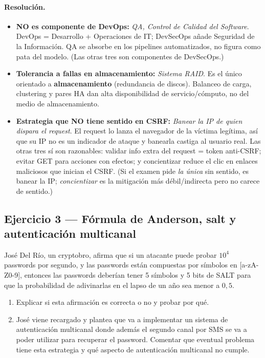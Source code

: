 \paragraph{Resolución.}
\begin{itemize}
  \item \textbf{NO es componente de DevOps:} \emph{QA, Control de Calidad del Software}. DevOps = Desarrollo + Operaciones de IT; DevSecOps añade Seguridad de la Información. QA se absorbe en los pipelines automatizados, no figura como pata del modelo. (Las otras tres son componentes de DevSecOps.)
  \item \textbf{Tolerancia a fallas en almacenamiento:} \emph{Sistema RAID}. Es el único orientado a \textbf{almacenamiento} (redundancia de discos). Balanceo de carga, clustering y pares HA dan alta disponibilidad de servicio/cómputo, no del medio de almacenamiento.
  \item \textbf{Estrategia que NO tiene sentido en CSRF:} \emph{Banear la IP de quien dispara el request}. El request lo lanza el navegador de la víctima legítima, así que su IP no es un indicador de ataque y banearla castiga al usuario real. Las otras tres sí son razonables: validar info extra del request = token anti-CSRF; evitar GET para acciones con efectos; y concientizar reduce el clic en enlaces maliciosos que inician el CSRF. (Si el examen pide \emph{la única} sin sentido, es banear la IP; \emph{concientizar} es la mitigación más débil/indirecta pero no carece de sentido.)
\end{itemize}

\subsection{Ejercicio 3 — Fórmula de Anderson, salt y autenticación multicanal}

\begin{consigna}
José Del Río, un cryptobro, afirma que si un atacante puede probar $10^4$ passwords por segundo, y las passwords están compuestas por símbolos en [a-zA-Z0-9], entonces las passwords deberían tener 5 símbolos y 5 bits de SALT para que la probabilidad de adivinarlas en el lapso de un año sea menor a $0{,}5$.

\begin{enumerate}
  \item[a)] Explicar si esta afirmación es correcta o no y probar por qué.
  \item[b)] José viene recargado y plantea que va a implementar un sistema de autenticación multicanal donde además el segundo canal por SMS se va a poder utilizar para recuperar el password. Comentar que eventual problema tiene esta estrategia y qué aspecto de autenticación multicanal no cumple.
\end{enumerate}
\end{consigna}

